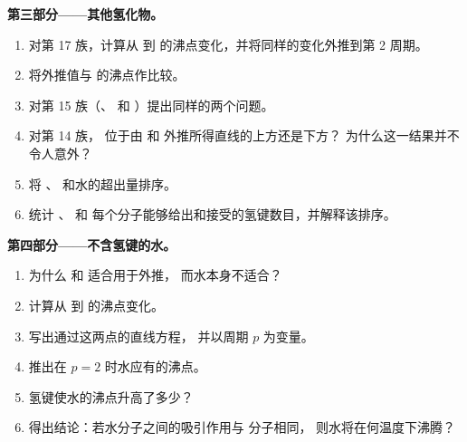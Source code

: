 \begin{problem}
\medskip
\noindent\textbf{第三部分——其他氢化物。}
\begin{enumerate}[resume]
  \item 对第 17 族，计算从  到
         的沸点变化，并将同样的变化外推到第 2 周期。
  \item 将外推值与  的沸点作比较。
  \item 对第 15 族（、 和
        ）提出同样的两个问题。
  \item 对第 14 族， 位于由  和  外推所得直线的上方还是下方？
        为什么这一结果并不令人意外？
  \item 将 、 和水的超出量排序。
  \item 统计 、 和
         每个分子能够给出和接受的氢键数目，并解释该排序。
\end{enumerate}

\medskip
\noindent\textbf{第四部分——不含氢键的水。}
\begin{enumerate}[resume]
  \item 为什么  和  适合用于外推，
        而水本身不适合？
  \item 计算从  到  的沸点变化。
  \item 写出通过这两点的直线方程，
        并以周期 $p$ 为变量。
  \item 推出在 $p = 2$ 时水应有的沸点。
  \item 氢键使水的沸点升高了多少？
  \item 得出结论：若水分子之间的吸引作用与  分子相同，
        则水将在何温度下沸腾？
\end{enumerate}
\end{problem}
